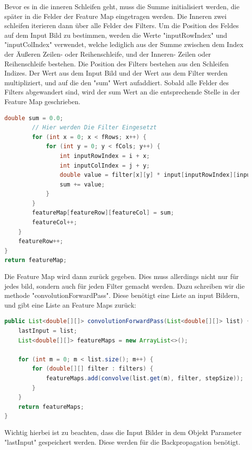 \documentclass[12pt]{article}
\begin{document}
Bevor es in die inneren Schleifen geht, muss die Summe initialisiert werden, die später in die Felder der Feature Map eingetragen werden. Die Inneren zwei schleifen iterieren dann über alle Felder des Filters. Um die Position des Feldes auf dem Input Bild zu bestimmen, werden die Werte "inputRowIndex" und "inputColIndex" verwendet, welche lediglich aus der Summe zwischen dem Index der Äußeren Zeilen- oder Reihenschleife, und der Inneren- Zeilen oder Reihenschleife bestehen. Die Position des Filters bestehen aus den Schleifen Indizes. Der Wert aus dem Input Bild und der Wert aus dem Filter werden multipliziert, und auf die den "sum" Wert aufaddiert. Sobald alle Felder des Filters abgewandert sind, wird der sum Wert an die entsprechende Stelle in der Feature Map geschrieben.

\begin{lstlisting}[language=Java]
        double sum = 0.0;
        // Hier werden Die Filter Eingesetzt
        for (int x = 0; x < fRows; x++) {
            for (int y = 0; y < fCols; y++) {
                int inputRowIndex = i + x;
                int inputColIndex = j + y;
                double value = filter[x][y] * input[inputRowIndex][inputColIndex];
                sum += value;
            }
        }
        featureMap[featureRow][featureCol] = sum;
        featureCol++;
    }
    featureRow++;
}
return featureMap;  
\end{lstlisting}

Die Feature Map wird dann zurück gegeben. Dies muss allerdings nicht nur für jedes bild, sondern auch für jeden Filter gemacht werden. Dazu schreiben wir die methode "convolutionForwardPass". Diese benötigt eine Liste an input Bildern, und gibt eine Liste an Feature Maps zurück:

\begin{lstlisting}[language=Java]
public List<double[][]> convolutionForwardPass(List<double[][]> list) {
    lastInput = list;
    List<double[][]> featureMaps = new ArrayList<>();

    for (int m = 0; m < list.size(); m++) {
        for (double[][] filter : filters) {
            featureMaps.add(convolve(list.get(m), filter, stepSize));
        }
    }
    return featureMaps;
}
\end{lstlisting}

Wichtig hierbei ist zu beachten, dass die Input Bilder in dem Objekt Parameter "lastInput" gespeichert werden. Diese werden für die Backpropagation benötigt.


\end{document}
